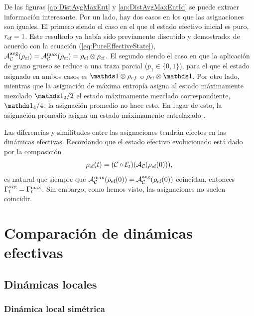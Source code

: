 De las figuras \ref{ap:DistAvgMaxEnt} y \ref{ap:DistAvgMaxEntId} se puede extraer información interesante. Por un lado, hay dos casos en los que las asignaciones son iguales. El primero siendo el caso en el que el estado efectivo inicial es puro, \ie{} $r_{\text{ef}}=1$. Este resultado ya había sido previamente discutido y demostrado: de acuerdo con la ecuación (\ref{eq:PureEffectiveState}), $\mathcal{A}_{\mathcal{C}}^{\text{avg}}(\rho_{\text{ef}})=\mathcal{A}_{\mathcal{C}}^{\max}(\rho_{\text{ef}})=\rho_{\text{ef}}\otimes\rho_{\text{ef}}$. El segundo siendo el caso en que la aplicación de grano grueso se reduce a una traza parcial ($p_{1}\in\{0,1\}$), para el que el estado asignado en ambos casos es $\Id\otimes\rho_{ef}$ o $\rho_{\ef}\otimes\Id$. Por otro lado, mientras que la asignación de máxima entropía asigna al estado máximamente mezclado $\Id_{2}/2$ el estado máximamente mezclado correspondiente, $\Id_{4}/4$, la asignación promedio no hace esto. En lugar de esto, la asignación promedio asigna un estado máximamente entrelazado .

Las diferencias y similitudes entre las asignaciones tendrán efectos en las dinámicas efectivas. Recordando que el estado efectivo evolucionado está dado por la composición
\begin{equation}
    \rho_{\text{ef}}(t)=(\mathcal{C}\circ\mathcal{E}_{t})(\mathcal{A}_{\mathcal{C}}(\rho_{\text{ef}}(0))),\nonumber
\end{equation}
es natural que siempre que $\mathcal{A}_{\mathcal{C}}^{\max}(\rho_{\text{ef}}(0))=\mathcal{A}_{\mathcal{C}}^{\text{avg}}(\rho_{\text{ef}}(0))$ coincidan, entonces $\Gamma_{t}^{\text{avg}}=\Gamma_{t}^{\max}$. Sin embargo, como hemos visto, las asignaciones no suelen coincidir.


\section{Comparación de dinámicas efectivas}

\subsection{Dinámicas locales}

\subsubsection{Dinámica local simétrica}

